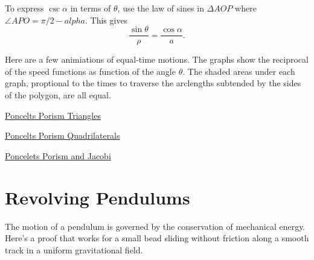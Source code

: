 \documentclass{ximera}
\begin{document}
To express $\csc\alpha$ in terms of $\theta$, use the law of sines in $\Delta AOP$ where $\angle APO = \pi/2 - alpha$. This gives
\[
    \frac{\sin\theta}{\rho} = \frac{\cos\alpha}{a}.
\]

\fi

Here are a few animiations of equal-time motions. The graphs show the reciprocal of the speed functions as function of the angle $\theta$. The shaded areas under each graph, proptional to the times to traverse the arclengths subtended by the sides of the polygon, are all equal.

\begin{exploration}

\begin{onlineOnly}
    \begin{center}
\end{center}
\end{onlineOnly}

\href{https://www.desmos.com/calculator/0aihemcv0o}{Poncelts Porism Triangles}

\end{exploration}


\begin{exploration}

\begin{onlineOnly}
    \begin{center}
\end{center}
\end{onlineOnly}

\href{https://www.desmos.com/calculator/pua4ogjcmr}{Poncelts Porism Quadrilaterals}


\end{exploration}


\begin{exploration}
\begin{onlineOnly}
    \begin{center}
\end{center}
\end{onlineOnly}

\href{https://www.desmos.com/calculator/lwbypn9rje}{Poncelets Porism and Jacobi}

\end{exploration}


\section*{Revolving Pendulums}
The motion of a pendulum is governed by the conservation of mechanical energy. Here's a proof that works for a small bead sliding without friction along a smooth track in a uniform gravitational field.
\end{document}
